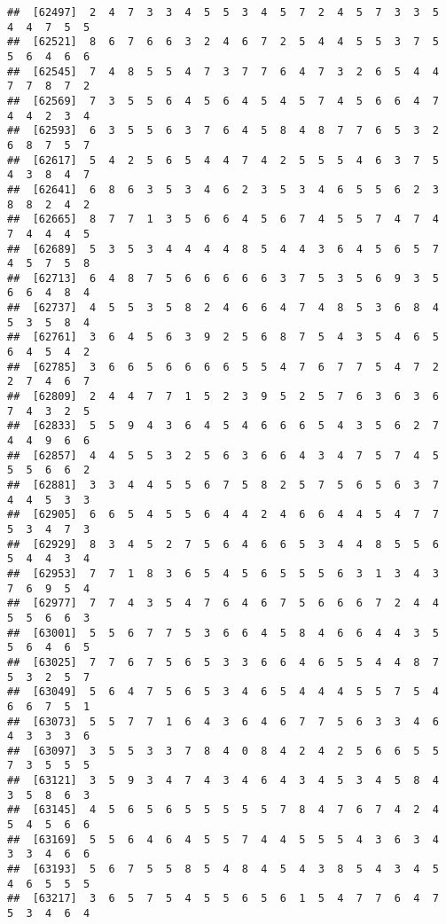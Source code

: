 \documentclass[
]{book}
\begin{document}
\begin{verbatim}
##  [62497]  2  4  7  3  3  4  5  5  3  4  5  7  2  4  5  7  3  3  5  4  4  7  5  5
##  [62521]  8  6  7  6  6  3  2  4  6  7  2  5  4  4  5  5  3  7  5  5  6  4  6  6
##  [62545]  7  4  8  5  5  4  7  3  7  7  6  4  7  3  2  6  5  4  4  7  7  8  7  2
##  [62569]  7  3  5  5  6  4  5  6  4  5  4  5  7  4  5  6  6  4  7  4  4  2  3  4
##  [62593]  6  3  5  5  6  3  7  6  4  5  8  4  8  7  7  6  5  3  2  6  8  7  5  7
##  [62617]  5  4  2  5  6  5  4  4  7  4  2  5  5  5  4  6  3  7  5  4  3  8  4  7
##  [62641]  6  8  6  3  5  3  4  6  2  3  5  3  4  6  5  5  6  2  3  8  8  2  4  2
##  [62665]  8  7  7  1  3  5  6  6  4  5  6  7  4  5  5  7  4  7  4  7  4  4  4  5
##  [62689]  5  3  5  3  4  4  4  4  8  5  4  4  3  6  4  5  6  5  7  4  5  7  5  8
##  [62713]  6  4  8  7  5  6  6  6  6  6  3  7  5  3  5  6  9  3  5  6  6  4  8  4
##  [62737]  4  5  5  3  5  8  2  4  6  6  4  7  4  8  5  3  6  8  4  5  3  5  8  4
##  [62761]  3  6  4  5  6  3  9  2  5  6  8  7  5  4  3  5  4  6  5  6  4  5  4  2
##  [62785]  3  6  6  5  6  6  6  6  5  5  4  7  6  7  7  5  4  7  2  2  7  4  6  7
##  [62809]  2  4  4  7  7  1  5  2  3  9  5  2  5  7  6  3  6  3  6  7  4  3  2  5
##  [62833]  5  5  9  4  3  6  4  5  4  6  6  6  5  4  3  5  6  2  7  4  4  9  6  6
##  [62857]  4  4  5  5  3  2  5  6  3  6  6  4  3  4  7  5  7  4  5  5  5  6  6  2
##  [62881]  3  3  4  4  5  5  6  7  5  8  2  5  7  5  6  5  6  3  7  4  4  5  3  3
##  [62905]  6  6  5  4  5  5  6  4  4  2  4  6  6  4  4  5  4  7  7  5  3  4  7  3
##  [62929]  8  3  4  5  2  7  5  6  4  6  6  5  3  4  4  8  5  5  6  5  4  4  3  4
##  [62953]  7  7  1  8  3  6  5  4  5  6  5  5  5  6  3  1  3  4  3  7  6  9  5  4
##  [62977]  7  7  4  3  5  4  7  6  4  6  7  5  6  6  6  7  2  4  4  5  5  6  6  3
##  [63001]  5  5  6  7  7  5  3  6  6  4  5  8  4  6  6  4  4  3  5  5  6  4  6  5
##  [63025]  7  7  6  7  5  6  5  3  3  6  6  4  6  5  5  4  4  8  7  5  3  2  5  7
##  [63049]  5  6  4  7  5  6  5  3  4  6  5  4  4  4  5  5  7  5  4  6  6  7  5  1
##  [63073]  5  5  7  7  1  6  4  3  6  4  6  7  7  5  6  3  3  4  6  4  3  3  3  6
##  [63097]  3  5  5  3  3  7  8  4  0  8  4  2  4  2  5  6  6  5  5  7  3  5  5  5
##  [63121]  3  5  9  3  4  7  4  3  4  6  4  3  4  5  3  4  5  8  4  3  5  8  6  3
##  [63145]  4  5  6  5  6  5  5  5  5  5  7  8  4  7  6  7  4  2  4  5  4  5  6  6
##  [63169]  5  5  6  4  6  4  5  5  7  4  4  5  5  5  4  3  6  3  4  3  3  4  6  6
##  [63193]  5  6  7  5  5  8  5  4  8  4  5  4  3  8  5  4  3  4  5  4  6  5  5  5
##  [63217]  3  6  5  7  5  4  5  5  6  5  6  1  5  4  7  7  6  4  7  5  3  4  6  4

\end{verbatim}
\end{document}
